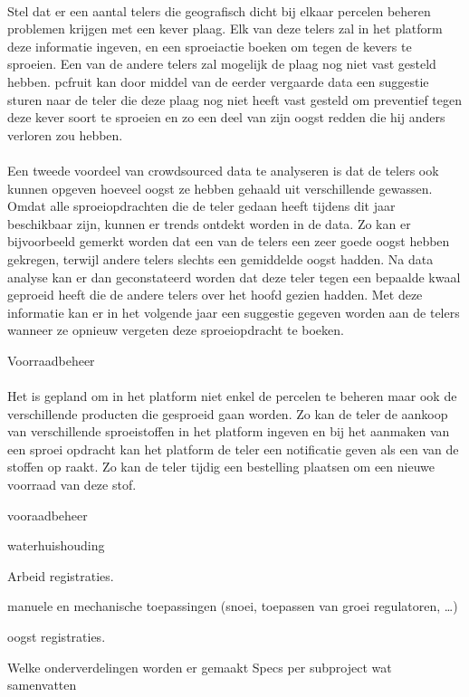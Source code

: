 \paragraph {} Stel dat er een aantal telers die geografisch dicht bij elkaar percelen
beheren problemen krijgen met een kever plaag. Elk van deze telers zal in het platform
deze informatie ingeven, en een sproeiactie boeken om tegen de kevers te sproeien. Een van
de andere telers zal mogelijk de plaag nog niet vast gesteld hebben. pcfruit kan door
middel van de eerder vergaarde data een suggestie sturen naar de teler die deze plaag nog
niet heeft vast gesteld om preventief tegen deze kever soort te sproeien en zo een deel
van zijn oogst redden die hij anders verloren zou hebben.

\paragraph {} Een tweede voordeel van crowdsourced data te analyseren is dat de telers ook
kunnen opgeven hoeveel oogst ze hebben gehaald uit verschillende gewassen. Omdat alle
sproeiopdrachten die de teler gedaan heeft tijdens dit jaar beschikbaar zijn, kunnen er
trends ontdekt worden in de data. Zo kan er bijvoorbeeld gemerkt worden dat een van de
telers een zeer goede oogst hebben gekregen, terwijl andere telers slechts een gemiddelde
oogst hadden. Na data analyse kan er dan geconstateerd worden dat deze teler tegen een
bepaalde kwaal geproeid heeft die de andere telers over het hoofd gezien hadden. Met deze
informatie kan er in het volgende jaar een suggestie gegeven worden aan de telers wanneer
ze opnieuw vergeten deze sproeiopdracht te boeken.

Voorraadbeheer

\paragraph {} Het is gepland om in het platform niet enkel de percelen te beheren maar ook de
verschillende producten die gesproeid gaan worden. Zo kan de teler de aankoop van
verschillende sproeistoffen in het platform ingeven en bij het aanmaken van een sproei
opdracht kan het platform de teler een notificatie geven als een van de stoffen op raakt.
Zo kan de teler tijdig een bestelling plaatsen om een nieuwe voorraad van deze stof.

vooraadbeheer

waterhuishouding

Arbeid registraties.

manuele en mechanische toepassingen (snoei,  toepassen van groei regulatoren, …)

oogst registraties.


Welke onderverdelingen worden er gemaakt
Specs per subproject wat samenvatten


